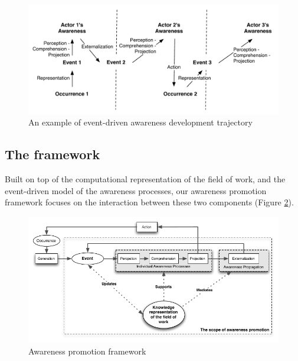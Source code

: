 \begin{figure}[htbp] %
   \centering
   \includegraphics[width=4.5in]{example_awareness_traj.pdf} 
   \caption{An example of event-driven awareness development trajectory}
   \label{fig:example_awareness_traj}
\end{figure}

\subsection{The framework} %
\label{sub:the_awareness_promotion_framework}
Built on top of the computational representation of the field of work, and the event-driven model of the awareness processes, our awareness promotion framework focuses on the interaction between these two components (Figure \ref{fig:awareness_promotion_framework}). 


\begin{figure}[htbp] %
   \centering
   \includegraphics[width=5.5in]{awareness_promotion_framework.pdf} 
   \caption{Awareness promotion framework}
   \label{fig:awareness_promotion_framework}
\end{figure}

